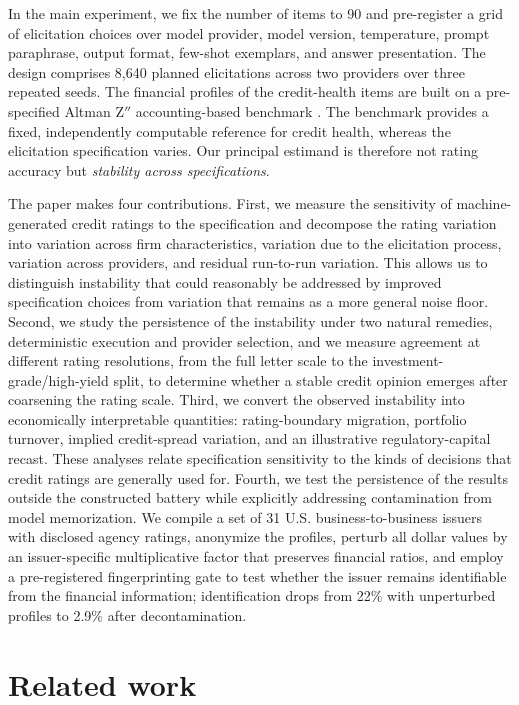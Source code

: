 \documentclass[pdflatex,sn-nature,lineno]{sn-jnl}
\theoremstyle{thmstyleone}
\begin{document}
In the main experiment, we fix the number of items to 90 and pre-register a grid of elicitation choices
over model provider, model version, temperature, prompt paraphrase, output format, few-shot exemplars,
and answer presentation. The design comprises 8{,}640 planned elicitations across two providers
over three repeated seeds. The financial profiles of the credit-health items are built on a pre-specified
Altman Z$''$ accounting-based benchmark \cite{altman1968}. The benchmark provides a fixed, independently
computable reference for credit health, whereas the elicitation specification varies. Our principal
estimand is therefore not rating accuracy but \emph{stability across specifications}.

The paper makes four contributions. First, we measure the sensitivity of machine-generated credit
ratings to the specification and decompose the rating variation into variation across firm
characteristics, variation due to the elicitation process, variation across providers, and residual
run-to-run variation. This allows us to distinguish instability that could reasonably be addressed by
improved specification choices from variation that remains as a more general noise floor. Second, we
study the persistence of the instability under two natural remedies, deterministic execution and provider
selection, and we measure agreement at different rating resolutions, from the full letter scale to the
investment-grade/high-yield split, to determine whether a stable credit opinion emerges after coarsening
the rating scale. Third, we convert the observed instability into economically interpretable quantities:
rating-boundary migration, portfolio turnover, implied credit-spread variation, and an illustrative
regulatory-capital recast. These analyses relate specification sensitivity to the kinds of decisions that
credit ratings are generally used for. Fourth, we test the persistence of the results outside the
constructed battery while explicitly addressing contamination from model memorization. We compile a set
of 31 U.S. business-to-business issuers with disclosed agency ratings, anonymize the profiles, perturb
all dollar values by an issuer-specific multiplicative factor that preserves financial ratios, and employ
a pre-registered fingerprinting gate to test whether the issuer remains identifiable from the financial
information; identification drops from 22\% with unperturbed profiles to 2.9\% after decontamination.

\section{Related work}
\end{document}
